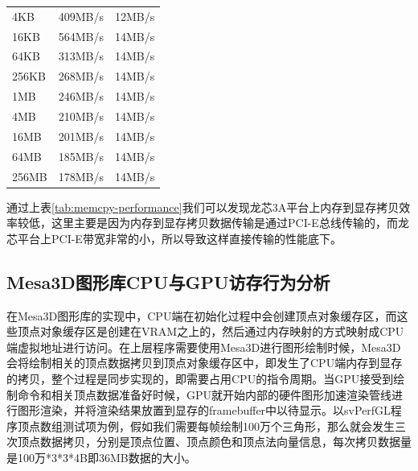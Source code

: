 \begin{center}  
\tablelasttail{\bottomrule}

\begin{supertabular}{p{5.cm}<{\centering}p{5.cm}<{\centering}m{6.cm}<{\centering}}
	4KB& 409MB/s& 12MB/s\\
	16KB& 564MB/s& 14MB/s\\
	64KB& 313MB/s& 14MB/s\\
	256KB& 268MB/s& 14MB/s\\
	1MB& 246MB/s& 14MB/s\\
	4MB& 210MB/s& 14MB/s\\
	16MB& 201MB/s& 14MB/s\\
	64MB& 185MB/s& 14MB/s\\
	256MB& 178MB/s& 14MB/s\\
\end{supertabular}
\end{center}

通过上表\ref{tab:memcpy-performance}我们可以发现龙芯3A平台上内存到显存拷贝效率较低，这里主要是因为内存到显存拷贝数据传输是通过PCI-E总线传输的，而龙芯平台上PCI-E带宽非常的小，所以导致这样直接传输的性能底下。

\subsection{Mesa3D图形库CPU与GPU访存行为分析}

在Mesa3D图形库的实现中，CPU端在初始化过程中会创建顶点对象缓存区，而这些顶点对象缓存区是创建在VRAM之上的，然后通过内存映射的方式映射成CPU端虚拟地址进行访问。在上层程序需要使用Mesa3D进行图形绘制时候，Mesa3D会将绘制相关的顶点数据拷贝到顶点对象缓存区中，即发生了CPU端内存到显存的拷贝，整个过程是同步实现的，即需要占用CPU的指令周期。当GPU接受到绘制命令和相关顶点数据准备好时候，GPU就开始内部的硬件图形加速渲染管线进行图形渲染，并将渲染结果放置到显存的framebuffer中以待显示。以svPerfGL程序顶点数组测试项为例，假如我们需要每帧绘制100万个三角形，那么就会发生三次顶点数据拷贝，分别是顶点位置、顶点颜色和顶点法向量信息，每次拷贝数据量是100万*3*3*4B即36MB数据的大小。

